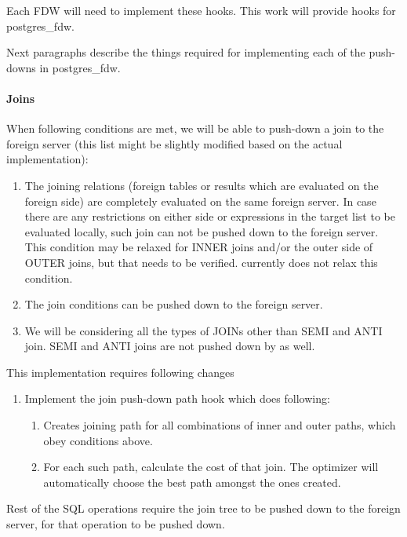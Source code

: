 	Each FDW will need to implement these hooks. This work will provide hooks for postgres\_fdw.

	Next paragraphs describe the things required for implementing each of the push-downs in postgres\_fdw.

\paragraph{Joins}

	When following conditions are met, we will be able to push-down a join to the foreign
	server (this list might be slightly modified based on the actual implementation):

	\begin{enumerate}
		\item The joining relations (foreign tables or results which are evaluated on
			  the foreign side) are completely evaluated on the same foreign server.
			  In case there are any restrictions on either side or expressions in the target
			  list to be evaluated locally, such join can not be pushed down to the foreign server.
			  This condition may be relaxed for INNER joins and/or the outer side of OUTER joins,
			  but that needs to be verified.
			  \XC{} currently does not relax this condition.
		\item The join conditions can be pushed down to the foreign server.
		\item We will be considering all the types of JOINs other than SEMI and ANTI join.
			  SEMI and ANTI joins are not pushed down by \XC{} as well.
	\end{enumerate}

	This implementation requires following changes

	\begin{enumerate}
		\item Implement the join push-down path hook which does following:
			\begin{enumerate}
				\item Creates joining path for all combinations of inner and outer paths,
					  which obey conditions above.
				\item For each such path, calculate the cost of that join.
					  The optimizer will automatically choose the best path amongst the ones created.
			\end{enumerate}
	\end{enumerate}

	Rest of the SQL operations require the join tree to be pushed down to the foreign server,
	for that operation to be pushed down.

